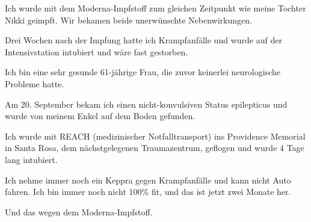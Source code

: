 Ich wurde mit dem Moderna-Impfstoff zum gleichen Zeitpunkt wie meine Tochter
Nikki geimpft. Wir bekamen beide unerwünschte Nebenwirkungen.

Drei Wochen nach der Impfung hatte ich Krampfanfälle und wurde auf der
Intensivstation intubiert und wäre fast gestorben.

Ich bin eine sehr gesunde 61-jährige Frau, die zuvor keinerlei neurologische
Probleme hatte.

Am 20. September bekam ich einen nicht-konvulsiven Status epilepticus und wurde
von meinem Enkel auf dem Boden gefunden.

Ich wurde mit REACH (medizinischer Notfalltransport) ins Providence Memorial in
Santa Rosa, dem nächstgelegenen Traumazentrum, geflogen und wurde 4 Tage lang
intubiert.

Ich nehme immer noch ein Keppra gegen Krampfanfälle und kann nicht Auto
fahren. Ich bin immer noch nicht 100\% fit, und das ist jetzt zwei Monate her.

Und das wegen dem Moderna-Impfstoff.
